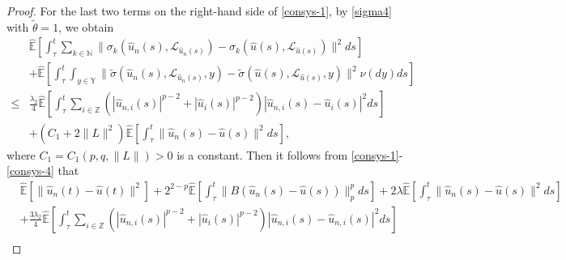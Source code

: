 \documentclass[11pt]{article}
\numberwithin{equation}{section}
\theoremstyle{plain}
\begin{document}
\begin{proof}
  For the last two terms on the right-hand side of \eqref{consys-1},
  by \eqref{sigma4} with $\tilde{\theta} = 1$, we obtain
 \begin{align}\label{consys-4}
        & \widehat{\mathbb{E}}
             \left[ \int_{\tau}^{t}
                       \sum_{k \in \mathbb{N} }
                             \| \sigma_k(\hat{u}_n(s),\mathcal{L}_{\hat{u}_n(s)}) - \sigma_k(\hat{u}(s),\mathcal{L}_{\hat{u}(s)})\|^2 ds
             \right]  \nonumber\\
        & + \widehat{\mathbb{E}}
               \left[ \int_{\tau}^{t}  \int_{
               y\in\mathbb{Y}
               }
                               \| \widetilde{\sigma}(\hat{u}_n(s),\mathcal{L}_{\hat{u}_n(s)},y)
                                   - \widetilde{\sigma}(\hat{u}(s),\mathcal{L}_{\hat{u}(s)},y)
                               \|^2 \nu(dy) ds
               \right]  \nonumber\\
      \le & \frac{\lambda_2}{4}
             \widehat{\mathbb{E}}
                \left[\int_{\tau}^{t} \sum_{i \in \mathbb{Z}}
                            \left( |\hat{u}_{n,i}(s)|^{p-2} + |\hat{u}_i(s)|^{p-2}
                            \right)
                            |\hat{u}_{n,i}(s) - \hat{u}_i(s)|^2 ds
                \right]  \nonumber\\
        & + \left(  C_1
             + 2 \| L \|^2
            \right)
            \widehat{\mathbb{E}}
                        \left[ \int_{\tau}^{t}
                                     \|\hat{u}_n(s) - \hat{u}(s)\|^2 ds
                        \right],
 \end{align}
 where $C_1 = C_1(p, q, \|L\|)>0$
 is a constant.
 Then it follows from \eqref{consys-1}-\eqref{consys-4} that
 \begin{align}\label{consys-5}
        & \widehat{\mathbb{E}} \left[ \|\hat{u}_n(t) - \hat{u}(t)\|^2 \right]
          + 2^{2-p} \widehat{\mathbb{E}}
              \left[ \int_{\tau}^{t}
                        \| B (\hat{u}_n(s) -  \hat{u}(s) ) \|_p^p ds
              \right]
          + 2 \lambda \widehat{\mathbb{E}}
              \left[ \int_{\tau}^{t} \|\hat{u}_n(s) - \hat{u}(s)\|^2 ds
              \right]  \nonumber\\
        & + \frac{3\lambda_2}{4} \widehat{\mathbb{E}}
             \left[ \int_{\tau}^{t}
                       \sum_{i \in \mathbb{Z}}
                         \left( |\hat{u}_{n,i}(s)|^{p-2} + |\hat{u}_{i}(s)|^{p-2}
                         \right) |\hat{u}_{n,i}(s) - \hat{u}_{n,i}(s)|^2 ds
             \right]  \nonumber\\

\end{align}
\end{proof}
\end{document}
